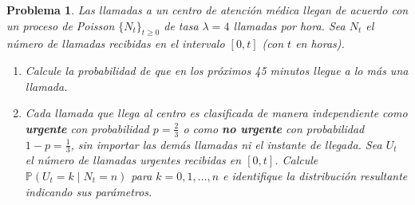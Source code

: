 \documentclass[12pt]{article}
\newtheorem{problem}{Problema}
\begin{document}
\begin{problem}
Las llamadas a un centro de atención médica llegan de acuerdo con un proceso de
Poisson $\{N_t\}_{t \geq 0}$ de tasa $\lambda = 4$ llamadas por hora. Sea $N_t$ el número de llamadas
recibidas en el intervalo $[0,t]$ (con $t$ en horas).

\begin{enumerate}

    \item[(a)] Calcule la probabilidad de que en los
        próximos 45 minutos llegue a lo más una llamada.

    \item[(b)] Cada llamada que llega al centro es clasificada de manera independiente como
        \textbf{urgente} con probabilidad $p = \tfrac{2}{3}$ o como \textbf{no urgente} con probabilidad
        $1-p = \tfrac{1}{3}$, sin importar las demás llamadas ni el instante de llegada.
        Sea $U_t$ el número de llamadas urgentes recibidas en $[0,t]$.
        Calcule $\mathbb{P}(U_t = k \mid N_t = n)$ para $k = 0, 1, \ldots, n$ e identifique la
        distribución resultante indicando sus parámetros.

\end{enumerate}
\end{problem}
\end{document}
